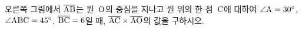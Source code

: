 \noindent\begin{minipage}[t]{0.58\linewidth}\vspace{0pt}\raggedright 오른쪽 그림에서 $\overline{\mathrm{AB}}$는 원~$\mathrm{O}$의 중심을 지나고 원 위의 한 점~$\mathrm{C}$에 대하여 $\angle\mathrm{A}=30^\circ$, $\angle\mathrm{ABC}=45^\circ$, $\overline{\mathrm{BC}}=6$일 때, $\overline{\mathrm{AC}}\times\overline{\mathrm{AO}}$의 값을 구하시오.\end{minipage}\hfill\begin{minipage}[t]{0.4\linewidth}\vspace{0pt}\centering \resizebox{\ifdim\width>\linewidth\linewidth\else\width\fi}{!}{}\end{minipage}\par
